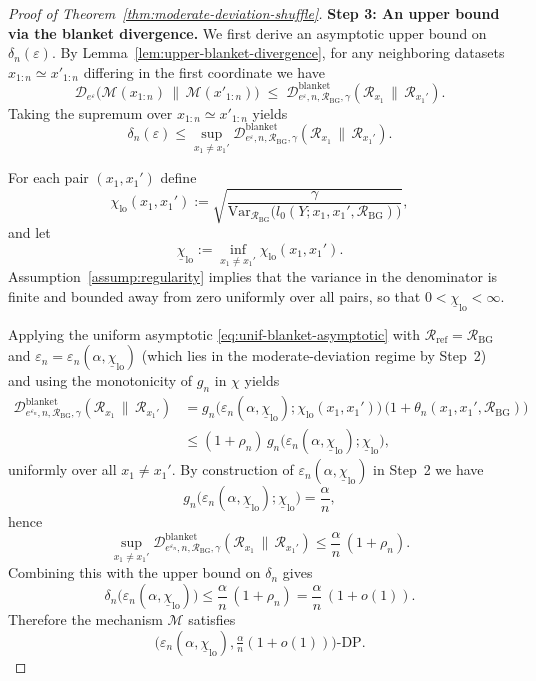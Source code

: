 \documentclass{article}
\theoremstyle{plain}
\theoremstyle{definition}
\begin{document}
\begin{proof}[Proof of Theorem~\ref{thm:moderate-deviation-shuffle}]
\medskip\noindent
\textbf{Step 3: An upper bound via the blanket divergence.}
We first derive an asymptotic upper bound on $\delta_n(\varepsilon)$.
By Lemma~\ref{lem:upper-blanket-divergence}, for any neighboring
datasets $x_{1:n}\simeq x'_{1:n}$ differing in the first coordinate we
have
\[
  \mathcal D_{e^\varepsilon}\bigl(
    \mathcal M(x_{1:n})
    \,\big\|\,
    \mathcal M(x'_{1:n})
  \bigr)
  \;\le\;
  \mathcal D^{\mathrm{blanket}}_{e^\varepsilon,n,\mathcal R_{\mathrm{BG}},\gamma}
    (\mathcal R_{x_1}\,\|\,\mathcal R_{x_1'}).
\]
Taking the supremum over $x_{1:n}\simeq x'_{1:n}$ yields
\[
  \delta_n(\varepsilon)
  \le
  \sup_{x_1\neq x_1'}
  \mathcal D^{\mathrm{blanket}}_{e^\varepsilon,n,\mathcal R_{\mathrm{BG}},\gamma}
    (\mathcal R_{x_1}\,\|\,\mathcal R_{x_1'}).
\]

For each pair $(x_1,x_1')$ define
\[
  \chi_{\mathrm{lo}}(x_1,x_1')
  :=
  \sqrt{
    \frac{\gamma}{
      \mathrm{Var}_{\mathcal R_{\mathrm{BG}}}
      \bigl(
        l_0(Y;x_1,x_1',\mathcal R_{\mathrm{BG}})
      \bigr)
    }
  },
\]
and let
\[
  \underline\chi_{\mathrm{lo}}
  :=
  \inf_{x_1\neq x_1'} \chi_{\mathrm{lo}}(x_1,x_1').
\]
Assumption~\ref{assump:regularity} implies that the variance in the
denominator is finite and bounded away from zero uniformly over all
pairs, so that $0<\underline\chi_{\mathrm{lo}}<\infty$.

Applying the uniform asymptotic
\eqref{eq:unif-blanket-asymptotic} with $\mathcal R_{\mathrm{ref}}=\mathcal R_{\mathrm{BG}}$
and $\varepsilon_n=\varepsilon_n(\alpha,\underline\chi_{\mathrm{lo}})$
(which lies in the moderate-deviation regime by Step~2) and using the
monotonicity of $g_n$ in $\chi$ yields
\[
  \begin{aligned}
  \mathcal D^{\mathrm{blanket}}_{e^{\varepsilon_n},n,\mathcal R_{\mathrm{BG}},\gamma}
    (\mathcal R_{x_1}\,\|\,\mathcal R_{x_1'})
  &=
  g_n\bigl(\varepsilon_n(\alpha,\underline\chi_{\mathrm{lo}});
           \chi_{\mathrm{lo}}(x_1,x_1')\bigr)\,
  \bigl(1+\theta_n(x_1,x_1',\mathcal R_{\mathrm{BG}})\bigr) \\
  &\le
  (1+\rho_n)\,
  g_n\bigl(\varepsilon_n(\alpha,\underline\chi_{\mathrm{lo}});
           \underline\chi_{\mathrm{lo}}\bigr),
  \end{aligned}
\]
uniformly over all $x_1\neq x_1'$. By construction of
$\varepsilon_n(\alpha,\underline\chi_{\mathrm{lo}})$ in Step~2 we have
\[
  g_n\bigl(\varepsilon_n(\alpha,\underline\chi_{\mathrm{lo}});
           \underline\chi_{\mathrm{lo}}\bigr)
  = \frac{\alpha}{n},
\]
hence
\[
  \sup_{x_1\neq x_1'}
  \mathcal D^{\mathrm{blanket}}_{e^{\varepsilon_n},n,\mathcal R_{\mathrm{BG}},\gamma}
    (\mathcal R_{x_1}\,\|\,\mathcal R_{x_1'})
  \le
  \frac{\alpha}{n}\,(1+\rho_n).
\]
Combining this with the upper bound on $\delta_n$ gives
\[
  \delta_n\bigl(\varepsilon_n(\alpha,\underline\chi_{\mathrm{lo}})\bigr)
  \le
  \frac{\alpha}{n}\,(1+\rho_n)
  =
  \frac{\alpha}{n}\,(1+o(1)).
\]
Therefore the mechanism $\mathcal M$ satisfies
\[
  \bigl(\varepsilon_n(\alpha,\underline\chi_{\mathrm{lo}}),
        \tfrac{\alpha}{n}(1+o(1))\bigr)\text{-DP}.
\]


\end{proof}
\end{document}
